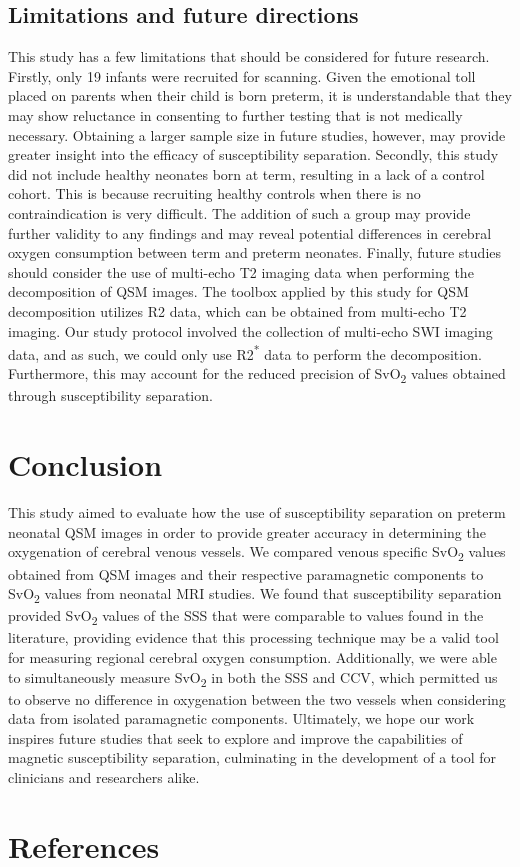\documentclass[
true
]{sn-jnl}
\begin{document}
\subsection{Limitations and future
directions}\label{limitations-and-future-directions}

This study has a few limitations that should be considered for future
research. Firstly, only 19 infants were recruited for scanning. Given
the emotional toll placed on parents when their child is born preterm,
it is understandable that they may show reluctance in consenting to
further testing that is not medically necessary. Obtaining a larger
sample size in future studies, however, may provide greater insight into
the efficacy of susceptibility separation. Secondly, this study did not
include healthy neonates born at term, resulting in a lack of a control
cohort. This is because recruiting healthy controls when there is no
contraindication is very difficult. The addition of such a group may
provide further validity to any findings and may reveal potential
differences in cerebral oxygen consumption between term and preterm
neonates. Finally, future studies should consider the use of multi-echo
T2 imaging data when performing the decomposition of QSM images. The
toolbox applied by this study for QSM decomposition
\citep{shinHseparationMagneticSusceptibility2021} utilizes R2 data,
which can be obtained from multi-echo T2 imaging. Our study protocol
involved the collection of multi-echo SWI imaging data, and as such, we
could only use R2\textsuperscript{*} data to perform the decomposition.
Furthermore, this may account for the reduced precision of
SvO\textsubscript{2} values obtained through susceptibility separation.

\section{Conclusion}\label{sec-conclusion}

This study aimed to evaluate how the use of susceptibility separation on
preterm neonatal QSM images in order to provide greater accuracy in
determining the oxygenation of cerebral venous vessels. We compared
venous specific SvO\textsubscript{2} values obtained from QSM images and
their respective paramagnetic components to SvO\textsubscript{2} values
from neonatal MRI studies. We found that susceptibility separation
provided SvO\textsubscript{2} values of the SSS that were comparable to
values found in the literature, providing evidence that this processing
technique may be a valid tool for measuring regional cerebral oxygen
consumption. Additionally, we were able to simultaneously measure
SvO\textsubscript{2} in both the SSS and CCV, which permitted us to
observe no difference in oxygenation between the two vessels when
considering data from isolated paramagnetic components. Ultimately, we
hope our work inspires future studies that seek to explore and improve
the capabilities of magnetic susceptibility separation, culminating in
the development of a tool for clinicians and researchers alike.

\section*{References}\label{references}

\renewcommand{\bibsection}{}

\end{document}
